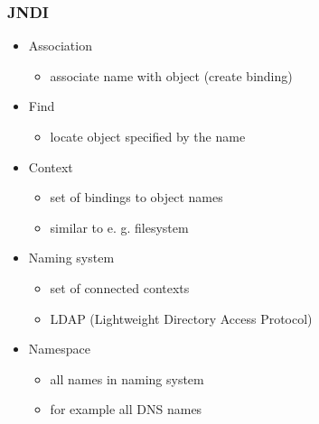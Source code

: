 \documentclass[10pt,xcolor=pdflatex]{beamer}
\begin{document}
\begin{frame}[containsverbatim]\frametitle{JNDI}
\begin{itemize}
	\item Association
	  \begin{itemize}
		\item associate name with object (create binding)
	  \end{itemize}
    \item Find
	  \begin{itemize}
		\item locate object specified by the name
	  \end{itemize}
	\item Context
	  \begin{itemize}
	    \item set of bindings to object names
	    \item similar to e. g. filesystem
	  \end{itemize}
    \item Naming system
	  \begin{itemize}
	    \item set of connected contexts
	    \item LDAP (Lightweight Directory Access Protocol)
	  \end{itemize}
    \item Namespace	
      \begin{itemize}
    	\item all names in naming system
		\item for example all DNS names
      \end{itemize}
\end{itemize}
\end{frame}
\end{document}
